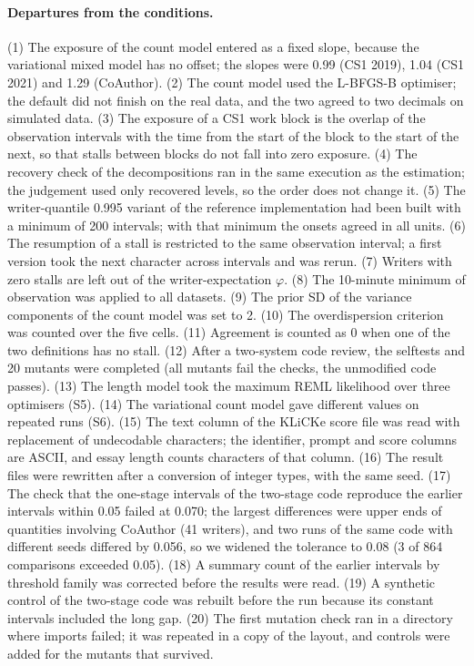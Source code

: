 \paragraph{Departures from the conditions.} (1) The exposure of the count model entered as a fixed slope, because the
variational mixed model has no offset; the slopes were 0.99 (CS1 2019), 1.04 (CS1 2021) and 1.29 (CoAuthor). (2) The
count model used the L-BFGS-B optimiser; the default did not finish on the real data, and the two agreed to two
decimals on simulated data. (3) The exposure of a CS1 work block is the overlap of the observation intervals with the
time from the start of the block to the start of the next, so that stalls between blocks do not fall into zero
exposure. (4) The recovery check of the decompositions ran in the same execution as the estimation; the judgement used
only recovered levels, so the order does not change it. (5) The writer-quantile 0.995 variant of the reference
implementation had been built with a minimum of 200 intervals; with that minimum the onsets agreed in all units. (6) The
resumption of a stall is restricted to the same observation interval; a first version took the next character across
intervals and was rerun. (7) Writers with zero stalls are left out of the writer-expectation $\varphi$. (8) The
10-minute minimum of observation was applied to all datasets. (9) The prior SD of the variance components of the count
model was set to 2. (10) The overdispersion criterion was counted over the five cells. (11) Agreement is counted as 0
when one of the two definitions has no stall. (12) After a two-system code review, the selftests and 20 mutants were
completed (all mutants fail the checks, the unmodified code passes). (13) The length model took the maximum REML
likelihood over three optimisers (S5). (14) The variational count model gave different values on repeated runs (S6).
(15) The text column of the KLiCKe score file was read with replacement of undecodable characters; the identifier,
prompt and score columns are ASCII, and essay length counts characters of that column. (16) The result files were
rewritten after a conversion of integer types, with the same seed. (17) The check that the one-stage intervals of the
two-stage code reproduce the earlier intervals within 0.05 failed at 0.070; the largest differences were upper ends of
quantities involving CoAuthor (41 writers), and two runs of the same code with different seeds differed by 0.056, so we
widened the tolerance to 0.08 (3 of 864 comparisons exceeded 0.05). (18) A summary count of the earlier intervals by
threshold family was corrected before the results were read. (19) A synthetic control of the two-stage code was
rebuilt before the run because its constant intervals included the long gap. (20) The first mutation check ran in a
directory where imports failed; it was repeated in a copy of the layout, and controls were added for the mutants that
survived.

